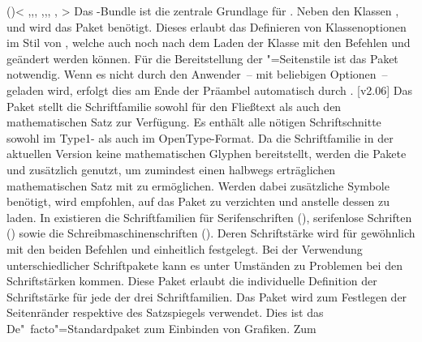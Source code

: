 \begin{DeclarePackages}
\itempkg{}()<%
    ,,,
    ,,,
    ,
>%
  Das \KOMAScript-Bundle ist die zentrale Grundlage für \TUDScript. Neben den 
  Klassen ,  und  wird das Paket 
   benötigt. Dieses erlaubt das Definieren von Klassenoptionen 
  im Stil von \KOMAScript, welche auch noch nach dem Laden der Klasse mit den 
  Befehlen  und  geändert werden können. Für 
  die Bereitstellung der "=Seitenstile ist das Paket 
   notwendig. Wenn es nicht durch den Anwender~-- mit 
  beliebigen Optionen~-- geladen wird, erfolgt dies am Ende der Präambel 
  automatisch durch \TUDScript.
[v2.06]
  Das Paket  stellt die Schriftfamilie \OpenSans sowohl für 
  den Fließtext als auch den mathematischen Satz zur Verfügung. Es enthält alle 
  nötigen Schriftschnitte sowohl im Type1- als auch im OpenType-Format. Da die 
  Schriftfamilie in der aktuellen Version keine mathematischen Glyphen 
  bereitstellt, werden die Pakete  und  
  zusätzlich genutzt, um zumindest einen halbwegs erträglichen mathematischen 
  Satz mit \OpenSans zu ermöglichen. Werden dabei zusätzliche Symbole benötigt, 
  wird empfohlen, auf das Paket  zu verzichten und anstelle 
  dessen  zu laden.
  In  existieren die Schriftfamilien für Serifenschriften 
  (), serifenlose Schriften () sowie die 
  Schreibmaschinenschriften (). Deren Schriftstärke wird für 
  gewöhnlich mit den beiden Befehlen  und  
  einheitlich festgelegt. Bei der Verwendung unterschiedlicher Schriftpakete 
  kann es unter Umständen zu Problemen bei den Schriftstärken kommen. Diese 
  Paket erlaubt die individuelle Definition der Schriftstärke für jede der drei 
  Schriftfamilien.
  Das Paket wird zum Festlegen der Seitenränder respektive des Satzspiegels 
  verwendet.
  Dies ist das De"~facto"=Standardpaket zum Einbinden von Grafiken. Zum 

\end{DeclarePackages}
